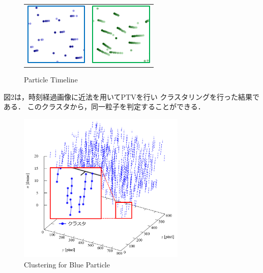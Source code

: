 \documentclass[twocolumn,a4j]{jsarticle}
\begin{document}
\begin{figure}[htbp]
	\begin{tabular}{cc}
		\begin{minipage}[t]{0.45\hsize}
			\centering
			\includegraphics[keepaspectratio, width=30mm]{../images/time-line_blue.png}
			\subcaption{Blue}
		\end{minipage} &
		\begin{minipage}[t]{0.45\hsize}
			\centering
			\includegraphics[keepaspectratio, width=30mm]{../images/time-line_green.png}
			\subcaption{Green}
		\end{minipage}
	\end{tabular}
	\caption{Particle Timeline}
\end{figure}

図2は，時刻経過画像に近法を用いてPTVを行い
クラスタリングを行った結果である．
このクラスタから，同一粒子を判定することができる．
\begin{figure}[htbp]
	\includegraphics[keepaspectratio, width=80mm]{../images/cluster_for_b.png}
	\caption{Clustering for Blue Particle}
\end{figure}
\end{document}
